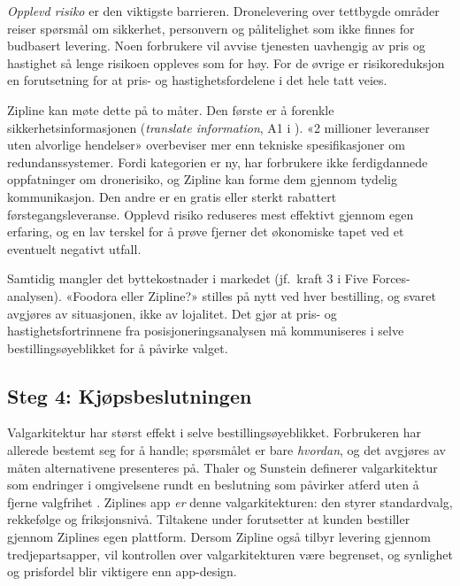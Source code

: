 \documentclass[12pt, a4paper]{article}
\begin{document}
\textit{Opplevd risiko} er den viktigste barrieren. Dronelevering over
tettbygde områder reiser spørsmål om sikkerhet, personvern og pålitelighet
som ikke finnes for budbasert levering. Noen forbrukere vil avvise
tjenesten uavhengig av pris og hastighet så lenge risikoen oppleves som
for høy. For de øvrige er risikoreduksjon en forutsetning for at pris- og
hastighetsfordelene i det hele tatt veies.

Zipline kan møte dette på to måter. Den første er å forenkle
sikkerhetsinformasjonen (\textit{translate information}, A1 i
\cite{muenscher2016}). «2 millioner leveranser uten alvorlige hendelser»
\parencite{dronexl2026} overbeviser mer enn tekniske spesifikasjoner om
redundanssystemer. Fordi kategorien er ny, har forbrukere ikke
ferdigdannede oppfatninger om dronerisiko, og Zipline kan forme dem
gjennom tydelig kommunikasjon. Den andre er en gratis eller sterkt
rabattert førstegangsleveranse. Opplevd risiko reduseres mest effektivt
gjennom egen erfaring, og en lav terskel for å prøve fjerner det
økonomiske tapet ved et eventuelt negativt utfall.

Samtidig mangler det byttekostnader i markedet (jf.\ kraft 3 i
Five Forces-analysen). «Foodora eller Zipline?» stilles på nytt ved hver
bestilling, og svaret avgjøres av situasjonen, ikke av lojalitet. Det gjør
at pris- og hastighetsfortrinnene fra posisjoneringsanalysen må
kommuniseres i selve bestillingsøyeblikket for å påvirke valget.

\subsection{Steg 4: Kjøpsbeslutningen}

Valgarkitektur har størst effekt i selve bestillingsøyeblikket. Forbrukeren
har allerede bestemt seg for å handle; spørsmålet er bare \textit{hvordan},
og det avgjøres av måten alternativene presenteres på. Thaler og Sunstein
definerer valgarkitektur som endringer i omgivelsene rundt en beslutning som
påvirker atferd uten å fjerne valgfrihet \parencite{thalersunstein2008}.
Ziplines app \textit{er} denne valgarkitekturen: den styrer standardvalg,
rekkefølge og friksjonsnivå. Tiltakene under forutsetter at kunden
bestiller gjennom Ziplines egen plattform. Dersom Zipline også tilbyr
levering gjennom tredjepartsapper, vil kontrollen over valgarkitekturen
være begrenset, og synlighet og prisfordel blir viktigere enn app-design.
\end{document}
